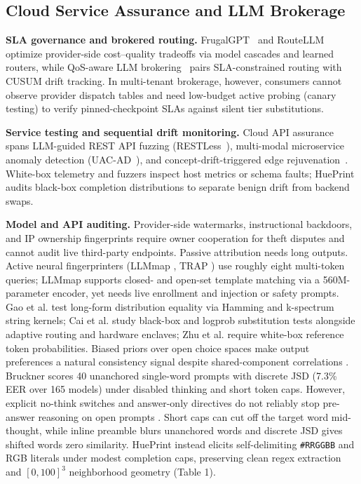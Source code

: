 \documentclass[10pt,journal,compsoc]{IEEEtran}
\begin{document}
\subsection{Cloud Service Assurance and LLM Brokerage}
\textbf{SLA governance and brokered routing.} FrugalGPT~\cite{ref1} and RouteLLM~\cite{ref2} optimize provider-side cost--quality tradeoffs via model cascades and learned routers, while QoS-aware LLM brokering~\cite{ref3} pairs SLA-constrained routing with CUSUM drift tracking. In multi-tenant brokerage, however, consumers cannot observe provider dispatch tables and need low-budget active probing (canary testing) to verify pinned-checkpoint SLAs against silent tier substitutions.

\textbf{Service testing and sequential drift monitoring.} Cloud API assurance spans LLM-guided REST API fuzzing (RESTLess~\cite{ref8}), multi-modal microservice anomaly detection (UAC-AD~\cite{ref9}), and concept-drift-triggered edge rejuvenation~\cite{ref10}. White-box telemetry and fuzzers inspect host metrics or schema faults; HuePrint audits black-box completion distributions to separate benign drift from backend swaps.

\textbf{Model and API auditing.} Provider-side watermarks, instructional backdoors, and IP ownership fingerprints \cite{ref11,ref12,ref13} require owner cooperation for theft disputes and cannot audit live third-party endpoints. Passive attribution \cite{ref14,ref15} needs long outputs. Active neural fingerprinters (LLMmap \cite{ref16}, TRAP \cite{ref17}) use roughly eight multi-token queries; LLMmap supports closed- and open-set template matching via a 560M-parameter encoder, yet needs live enrollment and injection or safety prompts. Gao et al. \cite{ref4} test long-form distribution equality via Hamming and k-spectrum string kernels; Cai et al. \cite{ref5} study black-box and logprob substitution tests alongside adaptive routing and hardware enclaves; Zhu et al. \cite{ref6} require white-box reference token probabilities. Biased priors over open choice spaces \cite{ref18,ref19,ref20,ref21} make output preferences a natural consistency signal despite shared-component correlations \cite{ref22,ref23}. Bruckner \cite{ref7} scores 40 unanchored single-word prompts with discrete JSD (7.3\% EER over 165 models) under disabled thinking and short token caps. However, explicit no-think switches and answer-only directives do not reliably stop pre-answer reasoning on open prompts \cite{ref24}. Short caps can cut off the target word mid-thought, while inline preamble blurs unanchored words and discrete JSD gives shifted words zero similarity. HuePrint instead elicits self-delimiting \texttt{\#RRGGBB} and RGB literals under modest completion caps, preserving clean regex extraction and $[0,100]^3$ neighborhood geometry (Table 1).
\end{document}
